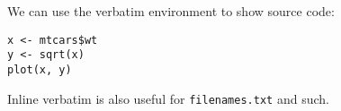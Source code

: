 \documentclass{article}
\begin{document}
We can use the verbatim environment to show source code:

\begin{verbatim}
x <- mtcars$wt
y <- sqrt(x)
plot(x, y)
\end{verbatim}

Inline verbatim is also useful for \verb|filenames.txt| and such.
\end{document}
